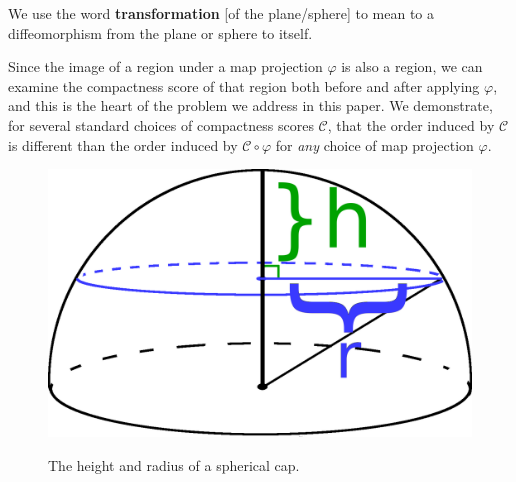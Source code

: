 \begin{definition}
We use the word \textbf{transformation} [of the plane/sphere] to mean
to a diffeomorphism from the plane or sphere to itself.
\end{definition}
Since the image of a region under a map projection $\varphi$ is also
a region, we can examine the compactness score of that region both 
before and after applying $\varphi$, and this is the heart of the
problem we address in this paper.  We demonstrate, for several
standard choices of compactness scores $\mathcal{C}$, that the order
induced by $\mathcal{C}$ is different than the order induced by
$\mathcal{C}\circ\varphi$ for \textit{any} choice of map projection
$\varphi$.


\begin{figure}
	\centering
	\includegraphics[width=.3\textwidth]{figs/spherecapschema}\\[1.5em]
	\caption{ The height and radius of a spherical cap. }
	\label{fig:caphr}
\end{figure}
